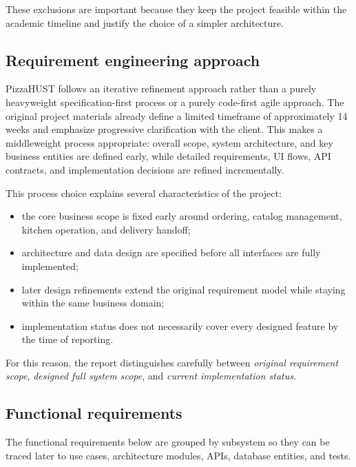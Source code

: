 These exclusions are important because they keep the project feasible within the academic timeline and justify the choice of a simpler architecture.

\subsection{Requirement engineering approach}

PizzaHUST follows an iterative refinement approach rather than a purely heavyweight specification-first process or a purely code-first agile approach. The original project materials already define a limited timeframe of approximately 14 weeks and emphasize progressive clarification with the client. This makes a middleweight process appropriate: overall scope, system architecture, and key business entities are defined early, while detailed requirements, UI flows, API contracts, and implementation decisions are refined incrementally.

This process choice explains several characteristics of the project:

\begin{itemize}
    \item the core business scope is fixed early around ordering, catalog management, kitchen operation, and delivery handoff;
    \item architecture and data design are specified before all interfaces are fully implemented;
    \item later design refinements extend the original requirement model while staying within the same business domain;
    \item implementation status does not necessarily cover every designed feature by the time of reporting.
\end{itemize}

For this reason, the report distinguishes carefully between \emph{original requirement scope}, \emph{designed full system scope}, and \emph{current implementation status}.

\subsection{Functional requirements}

The functional requirements below are grouped by subsystem so they can be traced later to use cases, architecture modules, APIs, database entities, and tests.

